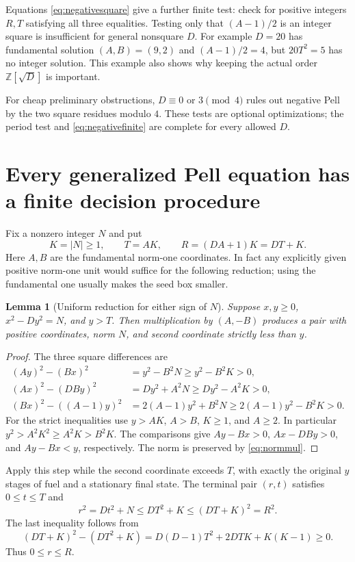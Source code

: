 \documentclass[11pt,letterpaper]{article}
\newtheorem{lemma}[theorem]{Lemma}
\theoremstyle{definition}
\newcommand{\Z}{\mathbb Z}
\newcommand{\abs}[1]{\lvert#1\rvert}
\begin{document}
Equations \eqref{eq:negativesquare} give a further finite test: check for
positive integers $R,T$ satisfying all three equalities. Testing only that
$(A-1)/2$ is an integer square is insufficient for general nonsquare $D$.
For example $D=20$ has fundamental solution $(A,B)=(9,2)$ and
$(A-1)/2=4$, but $20T^2=5$ has no integer solution. This example also
shows why keeping the actual order $\Z[\sqrt D]$ is important.

For cheap preliminary obstructions, $D\equiv0$ or $3\pmod4$ rules out
negative Pell by the two square residues modulo $4$. These tests are
optional optimizations; the period test and \eqref{eq:negativefinite}
are complete for every allowed $D$.

\section{Every generalized Pell equation has a finite decision procedure}\label{sec:general}

Fix a nonzero integer $N$ and put
\begin{equation}\label{eq:seedbounds}
 K=\abs N\ge1,\qquad T=AK,\qquad R=(DA+1)K=DT+K.
\end{equation}
Here $A,B$ are the fundamental norm-one coordinates. In fact any explicitly
given positive norm-one unit would suffice for the following reduction;
using the fundamental one usually makes the seed box smaller.

\begin{lemma}[Uniform reduction for either sign of $N$]\label{lem:generaldescent}
Suppose $x,y\ge0$, $x^2-Dy^2=N$, and $y>T$. Then multiplication by
$(A,-B)$ produces a pair with positive coordinates, norm $N$, and second
coordinate strictly less than $y$.
\end{lemma}
\begin{proof}
The three square differences are
\begin{align*}
 (Ay)^2-(Bx)^2&=y^2-B^2N\ge y^2-B^2K>0,\\
 (Ax)^2-(DBy)^2&=Dy^2+A^2N\ge Dy^2-A^2K>0,\\
 (Bx)^2-((A-1)y)^2
   &=2(A-1)y^2+B^2N\ge2(A-1)y^2-B^2K>0.
\end{align*}
For the strict inequalities use $y>AK$, $A>B$, $K\ge1$, and $A\ge2$.
In particular $y^2>A^2K^2\ge A^2K>B^2K$. The comparisons give
$Ay-Bx>0$, $Ax-DBy>0$, and $Ay-Bx<y$, respectively.
The norm is preserved by \eqref{eq:normmul}.
\end{proof}

Apply this step while the second coordinate exceeds $T$, with exactly the
original $y$ stages of fuel and a stationary final state. The terminal pair
$(r,t)$ satisfies $0\le t\le T$ and
\[
 r^2=Dt^2+N\le DT^2+K\le(DT+K)^2=R^2.
\]
The last inequality follows from
\[
 (DT+K)^2-(DT^2+K)
 =D(D-1)T^2+2DTK+K(K-1)\ge0.
\]
Thus $0\le r\le R$.
\end{document}
